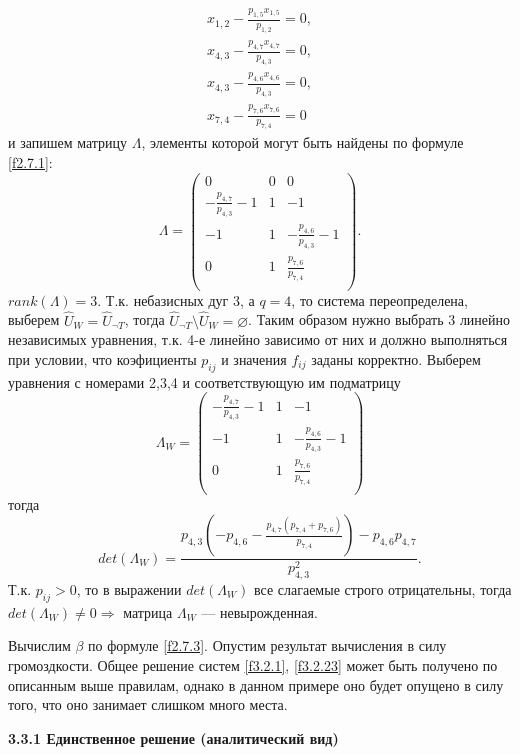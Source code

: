 \documentclass[14pt]{extarticle}%
\begin{document}
\begin{equation}\label{f3.2.23}
\begin{gathered}
x_{1,2}-\frac{p_{1,5} x_{1,5}}{p_{1,2}}=0,\\
x_{4,3}-\frac{p_{4,7} x_{4,7}}{p_{4,3}}=0,\\
x_{4,3}-\frac{p_{4,6} x_{4,6}}{p_{4,3}}=0,\\
x_{7,4}-\frac{p_{7,6} x_{7,6}}{p_{7,4}}=0
\end{gathered}
\end{equation}
и запишем матрицу $\Lambda$, элементы которой могут быть найдены по формуле \eqref{f2.7.1}:
$$
\Lambda=\left(
\begin{array}{ccc}
 0 & 0 & 0 \\
 -\frac{p_{4,7}}{p_{4,3}}-1 & 1 & -1 \\
 -1 & 1 & -\frac{p_{4,6}}{p_{4,3}}-1 \\
 0 & 1 & \frac{p_{7,6}}{p_{7,4}} \\
\end{array}
\right).
$$
$rank(\Lambda)=3$. Т.к. небазисных дуг 3, а $q=4$, то система переопределена, выберем $\widehat{U}_W=\widehat{U}_{\neg T}$, тогда $\widehat{U}_{\neg T}\setminus\widehat{U}_W=\varnothing$. Таким образом нужно выбрать 3 линейно независимых уравнения, т.к. 4-е линейно зависимо от них и должно выполняться при условии, что коэфициенты $p_{ij}$ и значения $f_{ij}$ заданы корректно. Выберем уравнения с номерами 2,3,4 и соответствующую им подматрицу
$$\Lambda_W=
\left(
\begin{array}{ccc}
 -\frac{p_{4,7}}{p_{4,3}}-1 & 1 & -1 \\
 -1 & 1 & -\frac{p_{4,6}}{p_{4,3}}-1 \\
 0 & 1 & \frac{p_{7,6}}{p_{7,4}} \\
\end{array}
\right)$$
тогда 
$$det(\Lambda_W)=\frac{p_{4,3} \left(-p_{4,6}-\frac{p_{4,7} \left(p_{7,4}+p_{7,6}\right)}{p_{7,4}}\right)-p_{4,6} p_{4,7}}{p_{4,3}^2}.$$
Т.к. $p_{ij}>0$, то в выражении $det(\Lambda_W)$ все слагаемые строго отрицательны, тогда $det(\Lambda_W)\neq 0 \Rightarrow$ матрица $\Lambda_W$ --- невырожденная. 

Вычислим $\beta$ по формуле \eqref{f2.7.3}. Опустим результат вычисления в силу громоздкости.
Общее решение систем \eqref{f3.2.1}, \eqref{f3.2.23} может быть получено по описанным выше правилам, однако в данном примере оно будет опущено в силу того, что оно занимает слишком много места.

\textbf{3.3.1 Единственное решение (аналитический вид)}
\end{document}
